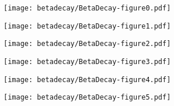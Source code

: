 \documentclass[thesis.tex]{subfiles}
\begin{document}
\begin{figure}
  \centering
  \begin{subfigure}{0.5\linewidth}
    \centering
    \hspace{1.1cm}
    \texttt{[image: betadecay/BetaDecay-figure0.pdf]}
  \end{subfigure}
  \hspace{-0.25\linewidth}
  \begin{subfigure}{0.5\linewidth}
    \centering
    \hspace{1.1cm}
    \texttt{[image: betadecay/BetaDecay-figure1.pdf]}
  \end{subfigure}
\end{figure}

\begin{figure}
  \centering
  \begin{subfigure}{0.5\linewidth}
    \centering
    \hspace{1.1cm}
    \texttt{[image: betadecay/BetaDecay-figure2.pdf]}
  \end{subfigure}
  \hspace{-0.225\linewidth}
  \begin{subfigure}{0.5\linewidth}
    \centering
    \hspace{1.1cm}
    \texttt{[image: betadecay/BetaDecay-figure3.pdf]}
  \end{subfigure}
\end{figure}

\begin{figure}
  \centering
  \begin{subfigure}{0.5\linewidth}
    \centering
    \hspace{1.0cm}
    \texttt{[image: betadecay/BetaDecay-figure4.pdf]}
  \end{subfigure}
  \hspace{-0.175\linewidth}
  \begin{subfigure}{0.5\linewidth}
    \centering
    \hspace{1.0cm}
    \texttt{[image: betadecay/BetaDecay-figure5.pdf]}
  \end{subfigure}
\end{figure}
\end{document}

